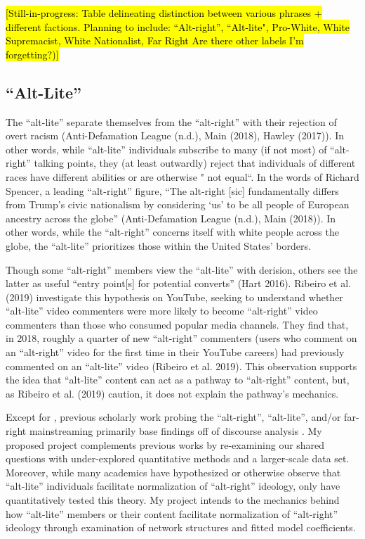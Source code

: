\documentclass[acmlarge, screen, authorversion]{acmart}
\begin{document}
\medskip

\hl{[Still-in-progress: Table delineating distinction between various phrases + different factions. 
Planning to include: ``Alt-right'', ``Alt-lite", Pro-White, White Supremacist, White Nationalist, Far Right
Are there other labels I'm forgetting?)]}

\medskip

\subsection{“Alt-Lite”}

The “alt-lite” separate themselves from the “alt-right” with their
rejection of overt racism (Anti-Defamation League (n.d.), Main (2018),
Hawley (2017)). In other words, while “alt-lite” individuals subscribe
to many (if not most) of “alt-right” talking points, they (at least
outwardly) reject that individuals of different races have different
abilities or are otherwise " not equal“. In the words of Richard
Spencer, a leading ``alt-right'' figure, “The alt-right [sic] fundamentally
differs from Trump’s civic nationalism by considering ‘us’ to be all
people of European ancestry across the globe” (Anti-Defamation League
(n.d.), Main (2018)). In other words, while the “alt-right” concerns
itself with white people across the globe, the “alt-lite” prioritizes
those within the United States’ borders.

Though some “alt-right” members view the “alt-lite” with derision,
others see the latter as useful “entry point[s] for potential converts”
(Hart 2016). Ribeiro et al. (2019) investigate this hypothesis on
YouTube, seeking to understand whether “alt-lite” video commenters were
more likely to become “alt-right” video commenters than those who
consumed popular media channels. They find that, in 2018, roughly a
quarter of new “alt-right” commenters (users who comment on an
“alt-right” video for the first time in their YouTube careers) had
previously commented on an “alt-lite” video (Ribeiro et al. 2019). This
observation supports the idea that “alt-lite” content can act as a
pathway to “alt-right” content, but, as Ribeiro et al. (2019) caution,
it does not explain the pathway’s mechanics.

Except for \citet{ribeiroAuditingRadicalizationPathways2019}, previous scholarly work probing the
“alt-right”, “alt-lite”, and/or far-right mainstreaming
primarily base findings off of discourse analysis \cite{cammaertsMainstreamingExtremeRightWing2018, gallaherMainstreamingWhiteSupremacy2020, lorenzo-dusDiscourseUSAltright2020, fergusWhitegenocideAltrightConspiracy2019}. My proposed project
complements previous works by re-examining our shared questions with
under-explored quantitative methods and a larger-scale data set. Moreover,
while many academics \cite{sternProudBoysWhite2019, nagleKillAllNormies2017, mainRiseAltRight2018} have hypothesized or otherwise observe that “alt-lite”
individuals facilitate normalization of “alt-right” ideology, only
\citet{ribeiroAuditingRadicalizationPathways2019} have quantitatively tested this theory. My
project intends to the mechanics behind how “alt-lite” members or their
content facilitate normalization of “alt-right” ideology through
examination of network structures and fitted model coefficients.
\end{document}
